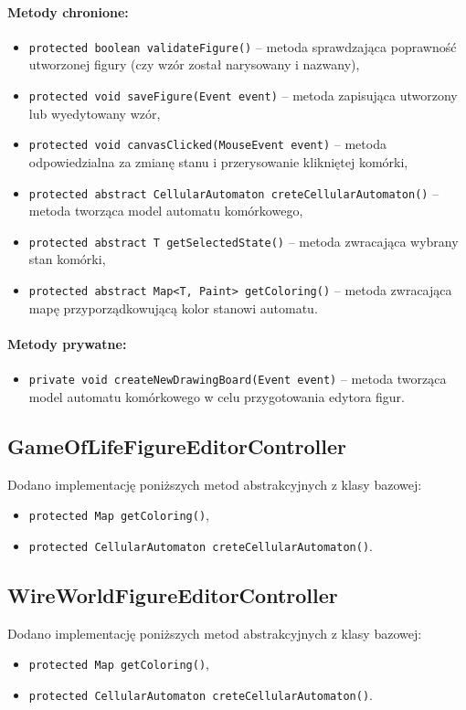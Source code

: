 \documentclass{mwart}
\begin{document}
\paragraph{Metody chronione:}
\begin{itemize}
	\item \texttt{protected boolean validateFigure()} -- metoda sprawdzająca poprawność utworzonej figury (czy wzór został narysowany i nazwany),
	\item \texttt{protected void saveFigure(Event event)} -- metoda zapisująca utworzony lub wyedytowany wzór,
	\item \texttt{protected void canvasClicked(MouseEvent event)} -- metoda odpowiedzialna za zmianę stanu i przerysowanie klikniętej komórki,
	\item \texttt{protected abstract CellularAutomaton creteCellularAutomaton()} -- metoda tworząca model automatu komórkowego,
	\item \texttt{protected abstract T getSelectedState()} -- metoda zwracająca wybrany stan komórki,
	\item \texttt{protected abstract Map<T, Paint> getColoring()} -- metoda zwracająca mapę przyporządkowującą kolor stanowi automatu.
\end{itemize}
\paragraph{Metody prywatne:}
\begin{itemize}
	\item \texttt{private void createNewDrawingBoard(Event event)} -- metoda tworząca model automatu komórkowego w celu przygotowania edytora figur.
\end{itemize}

\subsection{GameOfLifeFigureEditorController}
Dodano implementację poniższych metod abstrakcyjnych z klasy bazowej:
\begin{itemize}
	\item \texttt{protected Map getColoring()},
	\item \texttt{protected CellularAutomaton creteCellularAutomaton()}.
\end{itemize}

\subsection{WireWorldFigureEditorController}
Dodano implementację poniższych metod abstrakcyjnych z klasy bazowej:
\begin{itemize}
	\item \texttt{protected Map getColoring()},
	\item \texttt{protected CellularAutomaton creteCellularAutomaton()}.
\end{itemize}
\end{document}
